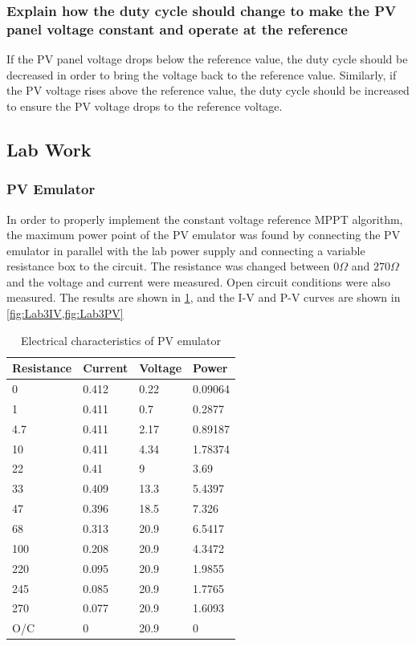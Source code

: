 \documentclass[]{article}
\begin{document}
			\subsubsection{Explain how the duty cycle should change to make the PV panel voltage constant and operate at the reference}
				If the PV panel voltage drops below the reference value, the duty cycle should be decreased in order to bring the voltage back to the reference value. Similarly, if the PV voltage rises above the reference value, the duty cycle should be increased to ensure the PV voltage drops to the reference voltage.
				
		\subsection{Lab Work}
			\subsubsection{PV Emulator}\label{sssec:PVEmu}
				In order to properly implement the constant voltage reference MPPT algorithm, the maximum power point of the PV emulator was found by connecting the PV emulator in parallel with the lab power supply and connecting a variable resistance box to the circuit. The resistance was changed between $0\Omega$ and $270\Omega$ and the voltage and current were measured. Open circuit conditions were also measured. The results are shown in \cref{tbl:Lab3Emu}, and the I-V and P-V curves are shown in \cref{fig:Lab3IV,fig:Lab3PV}
				\begin{table}[H]
					\centering
					\begin{tabular}{|l|l|l|l|}
						\hline												
						Resistance & Current & Voltage & Power \\ \hline
						0 & 0.412 & 0.22 & 0.09064 \\ \hline
						1 & 0.411 & 0.7 & 0.2877 \\ \hline
						4.7 & 0.411 & 2.17 & 0.89187 \\ \hline
						10 & 0.411 & 4.34 & 1.78374 \\ \hline
						22 & 0.41 & 9 & 3.69 \\ \hline
						33 & 0.409 & 13.3 & 5.4397 \\ \hline
						47 & 0.396 & 18.5 & 7.326 \\ \hline
						68 & 0.313 & 20.9 & 6.5417 \\ \hline
						100 & 0.208 & 20.9 & 4.3472 \\ \hline
						220 & 0.095 & 20.9 & 1.9855 \\ \hline
						245 & 0.085 & 20.9 & 1.7765 \\ \hline
						270 & 0.077 & 20.9 & 1.6093 \\ \hline
						O/C & 0 & 20.9 & 0 \\ \hline												
					\end{tabular}
					\caption{Electrical characteristics of PV emulator}
					\label{tbl:Lab3Emu}
				\end{table}
\end{document}
